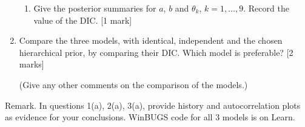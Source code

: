 \documentclass[11pt]{report}
\begin{document}
\begin{enumerate}
\begin{enumerate}
\item Give the posterior summaries for $a$, $b$ and $\theta_k$, $k=1,\ldots,9$. Record the value of the DIC.  [1 mark]


\end{enumerate}


\item  Compare the three models, with identical, independent and  the chosen hierarchical prior, by comparing their DIC. Which model is preferable? [2 marks]

(Give any other comments on the comparison of the models.)

\end{enumerate}

Remark.  In questions 1(a), 2(a), 3(a), provide history and autocorrelation plots as evidence for your conclusions. WinBUGS code for all 3 models is on Learn.
\end{document}
